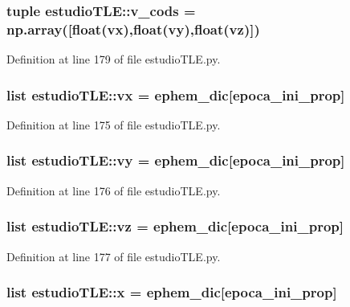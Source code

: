 \subsubsection[{v\-\_\-cods}]{\setlength{\rightskip}{0pt plus 5cm}tuple {\bf estudio\-T\-L\-E\-::v\-\_\-cods} = np.\-array([float({\bf vx}),float({\bf vy}),float({\bf vz})])}\label{namespaceestudio_t_l_e_afdeb675739ece4622166417475376aa8}


\-Definition at line 179 of file estudio\-T\-L\-E.\-py.

\subsubsection[{vx}]{\setlength{\rightskip}{0pt plus 5cm}list {\bf estudio\-T\-L\-E\-::vx} = {\bf ephem\-\_\-dic}[{\bf epoca\-\_\-ini\-\_\-prop}]}\label{namespaceestudio_t_l_e_a1c80cfb5f136a31fa13abded69a21e9f}


\-Definition at line 175 of file estudio\-T\-L\-E.\-py.

\subsubsection[{vy}]{\setlength{\rightskip}{0pt plus 5cm}list {\bf estudio\-T\-L\-E\-::vy} = {\bf ephem\-\_\-dic}[{\bf epoca\-\_\-ini\-\_\-prop}]}\label{namespaceestudio_t_l_e_afa5854431c0e127e4eda621500b33668}


\-Definition at line 176 of file estudio\-T\-L\-E.\-py.

\subsubsection[{vz}]{\setlength{\rightskip}{0pt plus 5cm}list {\bf estudio\-T\-L\-E\-::vz} = {\bf ephem\-\_\-dic}[{\bf epoca\-\_\-ini\-\_\-prop}]}\label{namespaceestudio_t_l_e_a05c5779853ecd24fe946bbb0c7af5c88}


\-Definition at line 177 of file estudio\-T\-L\-E.\-py.

\subsubsection[{x}]{\setlength{\rightskip}{0pt plus 5cm}list {\bf estudio\-T\-L\-E\-::x} = {\bf ephem\-\_\-dic}[{\bf epoca\-\_\-ini\-\_\-prop}]}\label{namespaceestudio_t_l_e_a563806c6a8999212459daf08a9226309}


